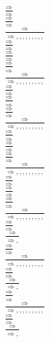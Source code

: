 \documentclass[11pt]{article}
\begin{document}
\begin{center}
\bigskip
\\$\frac{\Rightarrow }{\Rightarrow }$
\bigskip
\\$\frac{\Rightarrow }{\Rightarrow }$
\bigskip
\\$\frac{\Rightarrow }{\Rightarrow , , , , , , , , , }$
\bigskip
\\$\frac{\Rightarrow }{\Rightarrow }$
\bigskip
\\$\frac{\Rightarrow }{\Rightarrow }$
\bigskip
\\$\frac{\Rightarrow }{\Rightarrow }$
\bigskip
\\$\frac{\Rightarrow }{\Rightarrow , , , , , , , , , }$
\bigskip
\\$\frac{\Rightarrow }{\Rightarrow }$
\bigskip
\\$\frac{\Rightarrow }{\Rightarrow }$
\bigskip
\\$\frac{\Rightarrow }{\Rightarrow }$
\bigskip
\\$\frac{\Rightarrow }{\Rightarrow , , , , , , , , , }$
\bigskip
\\$\frac{\Rightarrow }{\Rightarrow }$
\bigskip
\\$\frac{\Rightarrow }{\Rightarrow }$
\bigskip
\\$\frac{\Rightarrow }{\Rightarrow }$
\bigskip
\\$\frac{\Rightarrow }{\Rightarrow , , , , , , , , , }$
\bigskip
\\$\frac{\Rightarrow }{\Rightarrow }$
\bigskip
\\$\frac{\Rightarrow }{\Rightarrow }$
\bigskip
\\$\frac{\Rightarrow }{\Rightarrow }$
\bigskip
\\$\frac{\Rightarrow }{\Rightarrow , , , , , , , , , }$
\bigskip
\\$\frac{\Rightarrow }{\Rightarrow }$
\bigskip
\\$\frac{\Rightarrow }{\Rightarrow , }$
\bigskip
\\$\frac{\Rightarrow }{\Rightarrow }$
\bigskip
\\$\frac{\Rightarrow }{\Rightarrow , , , , , , , , , }$
\bigskip
\\$\frac{\Rightarrow }{\Rightarrow }$
\bigskip
\\$\frac{\Rightarrow }{\Rightarrow , }$
\bigskip
\\$\frac{\Rightarrow }{\Rightarrow }$
\bigskip
\\$\frac{\Rightarrow }{\Rightarrow , , , , , , , , , }$
\bigskip
\\$\frac{\Rightarrow }{\Rightarrow }$
\bigskip
\\$\frac{\Rightarrow }{\Rightarrow , }$

\end{center}
\end{document}
